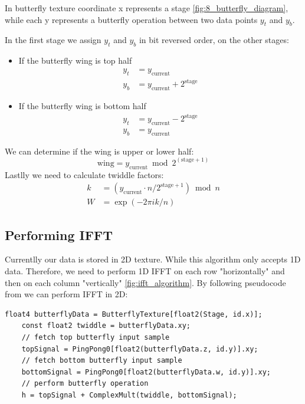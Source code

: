 In butterfly texture coordinate x represents a stage \ref{fig:8_butterfly_diagram}, while each y represents a butterfly operation between two data points $y_t$ and $y_b$.

In the first stage we assign $y_t$ and $y_b$ in bit reversed order, on the other stages:
\begin{itemize}
    \item If the butterfly wing is top half
    \begin{equation}
        \begin{split}
            y_t &= y_{\text{current}} \\
            y_b &= y_{\text{current}} + 2^{\text{stage}}
        \end{split}
    \end{equation}
    \item If the butterfly wing is bottom half
    \begin{equation}
        \begin{split}
            y_t &= y_{\text{current}} - 2^{\text{stage}} \\
            y_b &= y_{\text{current}}
        \end{split}
    \end{equation}
\end{itemize}
We can determine if the wing is upper or lower half:
\begin{equation}
    \text{wing} = y_{\text{current}} \bmod 2^{(\text{stage} + 1)}
\end{equation}
Lastlly we need to calculate twiddle factors:
\begin{equation}
    \begin{split}
        k &= (y_{\text{current}} \cdot n / 2^{\text{stage} + 1}) \bmod n \\
        W &= \exp(-2\pi i k / n)
    \end{split}
\end{equation}

\subsection{Performing IFFT}
Currentlly our data is stored in 2D texture. While this algorithm only accepts 1D data. Therefore, we need to perform 1D IFFT on each row "horizontally" and then on each column "vertically" \ref{fig:ifft_algorithm}.
By following pseudocode from \cite{flugge2017} we can perform IFFT in 2D:

\begin{lstlisting}[caption={Horizontal Butterfly Operation}, frame=single, numberstyle=\small\color{gray}, captionpos=b]
    float4 butterflyData = ButterflyTexture[float2(Stage, id.x)];
    const float2 twiddle = butterflyData.xy;
    // fetch top butterfly input sample
    topSignal = PingPong0[float2(butterflyData.z, id.y)].xy;
    // fetch bottom butterfly input sample
    bottomSignal = PingPong0[float2(butterflyData.w, id.y)].xy;
    // perform butterfly operation
    h = topSignal + ComplexMult(twiddle, bottomSignal);
\end{lstlisting}

